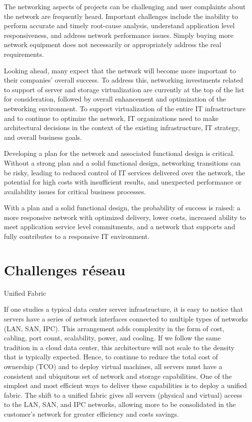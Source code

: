 The networking aspects of projects can be challenging and user complaints about the network are frequently heard. Important challenges include the inability to perform accurate and timely root-cause analysis, understand application level responsiveness, and address network performance issues. Simply buying more network equipment does not necessarily or appropriately address the real requirements.


Looking ahead, many expect that the network will become more important to their companies' overall success. To address this, networking investments related to support of server and storage virtualization are currently at the top of the list for consideration, followed by overall enhancement and optimization of the networking environment.
To support virtualization of the entire IT infrastructure and to continue to optimize the network, IT organizations need to make architectural decisions in the context of the existing infrastructure, IT strategy, and overall business goals.


Developing a plan for the network and associated functional design is critical. Without a strong plan and a solid functional design, networking transitions can be risky, leading to reduced control of IT services delivered over the network, the potential for high costs with insufficient results, and unexpected performance or availability issues for critical business processes.


With a plan and a solid functional design, the probability of success is raised: a more responsive network with optimized delivery, lower costs, increased ability to meet application service level commitments, and a network that supports and fully contributes to a responsive IT environment.

\section{Challenges réseau}

Unified Fabric

If one studies a typical data center server infrastructure, it is easy to notice that servers have a series of network interfaces connected to multiple types of networks (LAN, SAN, IPC). This arrangement adds complexity in the form of cost, cabling, port count, scalability, power, and cooling. If we follow the same tradition in a cloud data center, this architecture will not scale to the density that is typically expected. Hence, to continue to reduce the total cost of ownership (TCO) and to deploy virtual machines, all servers must have a consistent and ubiquitous set of network and storage capabilities. One of the simplest and most efficient ways to deliver these capabilities is to deploy a unified fabric. The shift to a unified fabric gives all servers (physical and virtual) access to the LAN, SAN, and IPC networks, allowing more to be consolidated in the customer’s network for greater efficiency and costs savings.

